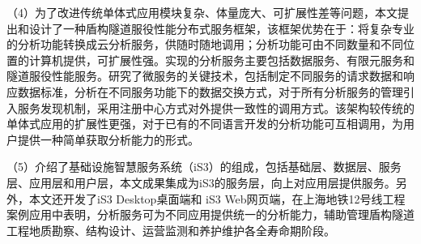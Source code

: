 \begin{cabstract}
（4）为了改进传统单体式应用模块复杂、体量庞大、可扩展性差等问题，本文提出和设计了一种盾构隧道服役性能分布式服务框架，该框架优势在于：将复杂专业的分析功能转换成云分析服务，供随时随地调用；分析功能可由不同数量和不同位置的计算机提供，可扩展性强。实现的分析服务主要包括数据服务、有限元服务和隧道服役性能服务。研究了微服务的关键技术，包括制定不同服务的请求数据和响应数据标准，分析在不同服务功能下的数据交换方式，对于所有分析服务的管理引入服务发现机制，采用注册中心方式对外提供一致性的调用方式。该架构较传统的单体式应用的扩展性更强，对于已有的不同语言开发的分析功能可互相调用，为用户提供一种简单获取分析能力的形式。

（5）介绍了基础设施智慧服务系统（iS3）的组成，包括基础层、数据层、服务层、应用层和用户层，本文成果集成为iS3的服务层，向上对应用层提供服务。另外，本文还开发了iS3 Desktop桌面端和 iS3 Web网页端，在上海地铁12号线工程案例应用中表明，分析服务可为不同应用提供统一的分析能力，辅助管理盾构隧道工程地质勘察、结构设计、运营监测和养护维护各全寿命期阶段。

\end{cabstract}




